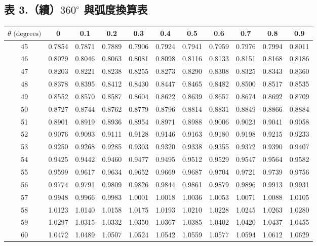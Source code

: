 \subsection*{表 3.\quad （續）$360^\circ$ 與弧度換算表}
{\centering\fontsize{7.5pt}{8.8pt}\selectfont\setlength{\tabcolsep}{3.5pt}\renewcommand{\arraystretch}{0.96}
\begin{tabular}{|c|cccccccccc|}
\hline
$\theta\text{ (degrees)}$ & 0 & 0.1 & 0.2 & 0.3 & 0.4 & 0.5 & 0.6 & 0.7 & 0.8 & 0.9 \\ \hline
45 & 0.7854 & 0.7871 & 0.7889 & 0.7906 & 0.7924 & 0.7941 & 0.7959 & 0.7976 & 0.7994 & 0.8011 \\
46 & 0.8029 & 0.8046 & 0.8063 & 0.8081 & 0.8098 & 0.8116 & 0.8133 & 0.8151 & 0.8168 & 0.8186 \\
47 & 0.8203 & 0.8221 & 0.8238 & 0.8255 & 0.8273 & 0.8290 & 0.8308 & 0.8325 & 0.8343 & 0.8360 \\
48 & 0.8378 & 0.8395 & 0.8412 & 0.8430 & 0.8447 & 0.8465 & 0.8482 & 0.8500 & 0.8517 & 0.8535 \\
49 & 0.8552 & 0.8570 & 0.8587 & 0.8604 & 0.8622 & 0.8639 & 0.8657 & 0.8674 & 0.8692 & 0.8709 \\
\hline
50 & 0.8727 & 0.8744 & 0.8762 & 0.8779 & 0.8796 & 0.8814 & 0.8831 & 0.8849 & 0.8866 & 0.8884 \\
51 & 0.8901 & 0.8919 & 0.8936 & 0.8954 & 0.8971 & 0.8988 & 0.9006 & 0.9023 & 0.9041 & 0.9058 \\
52 & 0.9076 & 0.9093 & 0.9111 & 0.9128 & 0.9146 & 0.9163 & 0.9180 & 0.9198 & 0.9215 & 0.9233 \\
53 & 0.9250 & 0.9268 & 0.9285 & 0.9303 & 0.9320 & 0.9338 & 0.9355 & 0.9372 & 0.9390 & 0.9407 \\
54 & 0.9425 & 0.9442 & 0.9460 & 0.9477 & 0.9495 & 0.9512 & 0.9529 & 0.9547 & 0.9564 & 0.9582 \\
\hline
55 & 0.9599 & 0.9617 & 0.9634 & 0.9652 & 0.9669 & 0.9687 & 0.9704 & 0.9721 & 0.9739 & 0.9756 \\
56 & 0.9774 & 0.9791 & 0.9809 & 0.9826 & 0.9844 & 0.9861 & 0.9879 & 0.9896 & 0.9913 & 0.9931 \\
57 & 0.9948 & 0.9966 & 0.9983 & 1.0001 & 1.0018 & 1.0036 & 1.0053 & 1.0071 & 1.0088 & 1.0105 \\
58 & 1.0123 & 1.0140 & 1.0158 & 1.0175 & 1.0193 & 1.0210 & 1.0228 & 1.0245 & 1.0263 & 1.0280 \\
59 & 1.0297 & 1.0315 & 1.0332 & 1.0350 & 1.0367 & 1.0385 & 1.0402 & 1.0420 & 1.0437 & 1.0455 \\
\hline
60 & 1.0472 & 1.0489 & 1.0507 & 1.0524 & 1.0542 & 1.0559 & 1.0577 & 1.0594 & 1.0612 & 1.0629 \\

\end{tabular}}
